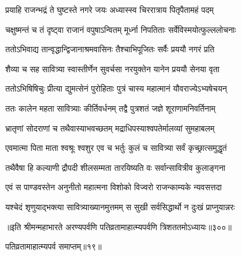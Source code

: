 \twolineshloka
{प्रयाहि राजन्भद्रं ते घुष्टस्ते नगरे जयः}
{अध्यास्स्व चिररात्राय पितृपैतामहं पदम्}




\twolineshloka
{चक्षुष्मन्तं च तं दृष्ट्वा राजानं वपुषाऽन्वितम्}
{मूर्ध्ना निपतिताः सर्वेविस्मयोत्फुल्ललोचनाः}


\twolineshloka
{ततोऽभिवाद्य तान्वृद्धान्द्विजानाश्रमवासिनः}
{तैश्चाभिपूजितः सर्वैः प्रययौ नगरं प्रति}


\twolineshloka
{शैव्या च सह सावित्र्या स्वास्तीर्णेन सुवर्चसा}
{नरयुक्तेन यानेन प्रययौ सेनया वृता}


\twolineshloka
{ततोऽभिषिषिचुः प्रीत्या द्युमत्सेनं पुरोहिताः}
{पुत्रं चास्य महात्मानं यौवराज्येऽभ्यषेचयन्}


\twolineshloka
{ततः कालेन महता सावित्र्याः कीर्तिवर्धनम्}
{तद्वै पुत्रशतं जज्ञे शूराणामनिवर्तिनाम्}


\twolineshloka
{भ्रातृणां सोदराणां च तथैवास्याभवच्छतम्}
{मद्राधिपस्याश्वपतेर्मालव्यां सुमहाबलम्}


\twolineshloka
{एवमात्मा पिता माता श्वश्रूः श्वशुर एव च}
{भर्तुः कुलं च सावित्र्या सर्वं कृच्छ्रात्समुद्धृतं}


\twolineshloka
{तथैवैषा हि कल्याणी द्रौपदी शीलसम्मता}
{तारयिष्यति वः सर्वान्सावित्रीव कुलाङ्गना}




\twolineshloka
{एवं स पाण्डवस्तेन अनुनीतो महात्मना}
{विशोको विज्वरो राजन्काम्यके न्यवसत्तदा}


\twolineshloka
{यश्चेदं शृणुयाद्भक्त्या सावित्र्याख्यानमुत्तमम्}
{स सुखी सर्वसिद्धार्थो न दुःखं प्राप्नुयान्नरः}


॥इति श्रीमन्महाभारते अरण्यपर्वणि पतिव्रतामाहात्म्यपर्वणि त्रिशततमोऽध्यायः॥३००॥

पतिव्रतामाहात्म्यपर्व समाप्तम्॥१९॥ 